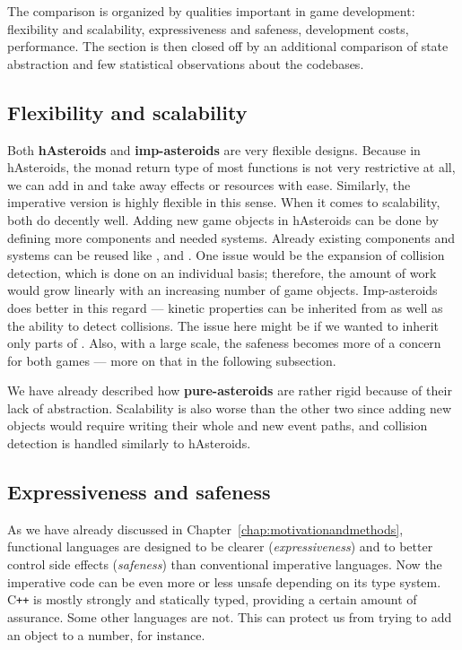 \documentclass[
  digital, %
  color,   %
  table,   %
  oneside, %
  lof,     %
  lot,     %
]{fithesis3}
\newcommand{\cpp}{C\nolinebreak\texttt{+}\nolinebreak\texttt{+}}
\begin{document}
{The comparison is organized by qualities important in game development:
flexibility and scalability, expressiveness and safeness, development costs, performance.
The section is then closed off by an additional comparison of state abstraction
and few statistical observations about the codebases.



\subsection{Flexibility and scalability}

Both \textbf{hAsteroids} and \textbf{imp-asteroids} are very flexible designs.
Because in hAsteroids, the monad return type of most functions is not very
restrictive at all, we can add in and take away effects or resources with ease.
Similarly, the imperative version is highly flexible in this sense. When it comes
to scalability, both do decently well. Adding new game objects in hAsteroids can be done by
defining more components and needed systems. Already existing components and systems can be reused
like ,  and .
One issue would be the expansion of collision detection,
which is done on an individual basis; therefore, the amount of work
would grow linearly with an increasing number of game objects.
Imp-asteroids does better in this regard --- kinetic properties can
be inherited from  as well as the ability to detect collisions.
The issue here might be if we wanted to inherit only parts of .
Also, with a large scale, the safeness becomes more of a concern for both games
--- more on that in the following subsection.

We have already described how \textbf{pure-asteroids} are rather rigid because of
their lack of abstraction. Scalability is also worse than the other two since
adding new objects would require writing their whole  and
new event paths, and collision detection is handled similarly to hAsteroids.



\subsection{Expressiveness and safeness}

As we have already discussed in Chapter~\ref{chap:motivationandmethods},
functional languages are designed to be clearer (\emph{expressiveness})
and to better control side effects (\emph{safeness}) than conventional
imperative languages. Now the imperative code can be even more or less unsafe
depending on its type system. \cpp{} is mostly strongly and statically typed,
providing a certain amount of assurance. Some other languages are not.
This can protect us from trying to add an object to a number, for instance.

}
\end{document}
